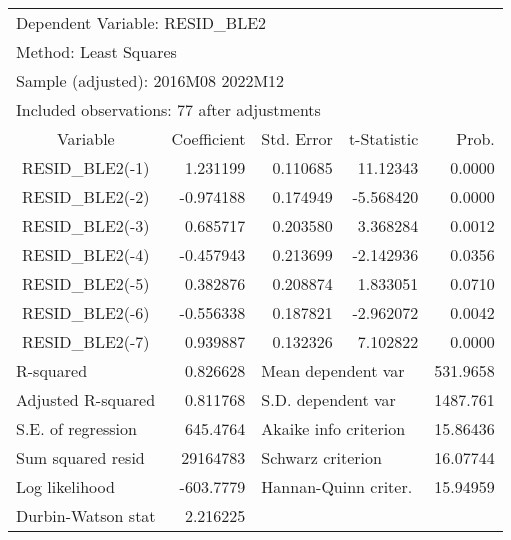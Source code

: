 
\begin{tabular}{lrrrr}
\toprule
\multicolumn{3}{l}{Dependent Variable: RESID\_BLE2}&\multicolumn{1}{c}{}&\multicolumn{1}{c}{}\\
\multicolumn{2}{l}{Method: Least Squares}&\multicolumn{1}{c}{}&\multicolumn{1}{c}{}&\multicolumn{1}{c}{}\\
\multicolumn{3}{l}{Sample (adjusted): 2016M08 2022M12}&\multicolumn{1}{c}{}&\multicolumn{1}{c}{}\\
\multicolumn{4}{l}{Included observations: 77 after adjustments}&\multicolumn{1}{c}{}\\
\midrule
\multicolumn{1}{c}{Variable}&\multicolumn{1}{r}{Coefficient}&\multicolumn{1}{r}{Std. Error}&\multicolumn{1}{r}{t-Statistic}&\multicolumn{1}{r}{Prob.}\\
\midrule
\multicolumn{1}{c}{RESID\_BLE2(-1)}&\multicolumn{1}{r}{1.231199}&\multicolumn{1}{r}{0.110685}&\multicolumn{1}{r}{11.12343}&\multicolumn{1}{r}{0.0000}\\
\multicolumn{1}{c}{RESID\_BLE2(-2)}&\multicolumn{1}{r}{-0.974188}&\multicolumn{1}{r}{0.174949}&\multicolumn{1}{r}{-5.568420}&\multicolumn{1}{r}{0.0000}\\
\multicolumn{1}{c}{RESID\_BLE2(-3)}&\multicolumn{1}{r}{0.685717}&\multicolumn{1}{r}{0.203580}&\multicolumn{1}{r}{3.368284}&\multicolumn{1}{r}{0.0012}\\
\multicolumn{1}{c}{RESID\_BLE2(-4)}&\multicolumn{1}{r}{-0.457943}&\multicolumn{1}{r}{0.213699}&\multicolumn{1}{r}{-2.142936}&\multicolumn{1}{r}{0.0356}\\
\multicolumn{1}{c}{RESID\_BLE2(-5)}&\multicolumn{1}{r}{0.382876}&\multicolumn{1}{r}{0.208874}&\multicolumn{1}{r}{1.833051}&\multicolumn{1}{r}{0.0710}\\
\multicolumn{1}{c}{RESID\_BLE2(-6)}&\multicolumn{1}{r}{-0.556338}&\multicolumn{1}{r}{0.187821}&\multicolumn{1}{r}{-2.962072}&\multicolumn{1}{r}{0.0042}\\
\multicolumn{1}{c}{RESID\_BLE2(-7)}&\multicolumn{1}{r}{0.939887}&\multicolumn{1}{r}{0.132326}&\multicolumn{1}{r}{7.102822}&\multicolumn{1}{r}{0.0000}\\
\midrule
\multicolumn{1}{l}{R-squared}&\multicolumn{1}{r}{0.826628}&\multicolumn{2}{l}{Mean dependent var}&\multicolumn{1}{r}{531.9658}\\
\multicolumn{1}{l}{Adjusted R-squared}&\multicolumn{1}{r}{0.811768}&\multicolumn{2}{l}{S.D. dependent var}&\multicolumn{1}{r}{1487.761}\\
\multicolumn{1}{l}{S.E. of regression}&\multicolumn{1}{r}{645.4764}&\multicolumn{2}{l}{Akaike info criterion}&\multicolumn{1}{r}{15.86436}\\
\multicolumn{1}{l}{Sum squared resid}&\multicolumn{1}{r}{29164783}&\multicolumn{2}{l}{Schwarz criterion}&\multicolumn{1}{r}{16.07744}\\
\multicolumn{1}{l}{Log likelihood}&\multicolumn{1}{r}{-603.7779}&\multicolumn{2}{l}{Hannan-Quinn criter.}&\multicolumn{1}{r}{15.94959}\\
\multicolumn{1}{l}{Durbin-Watson stat}&\multicolumn{1}{r}{2.216225}&\multicolumn{1}{c}{}&\multicolumn{1}{c}{}&\multicolumn{1}{c}{}\\
\bottomrule
\end{tabular}
